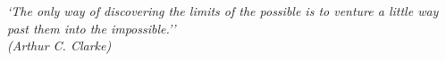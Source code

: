 \begin{epigrafe}
    \vspace*{\fill}
	\begin{flushright}

		\textit{`The only way of discovering the limits of the possible is to venture a little way past them into the impossible.''\\
		(Arthur C. Clarke)}
	\end{flushright}
\end{epigrafe}
